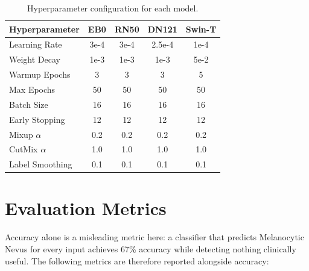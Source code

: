 \begin{table}[H]
\centering
\caption{Hyperparameter configuration for each model.}
\label{tab:hyperparams}
\begin{tabular}{lcccc}
\toprule
\textbf{Hyperparameter} & \textbf{EB0} & \textbf{RN50} & \textbf{DN121} & \textbf{Swin-T} \\
\midrule
Learning Rate        & 3e-4  & 3e-4  & 2.5e-4 & 1e-4 \\
Weight Decay         & 1e-3  & 1e-3  & 1e-3   & 5e-2 \\
Warmup Epochs        & 3     & 3     & 3      & 5 \\
Max Epochs           & 50    & 50    & 50     & 50 \\
Batch Size           & 16    & 16    & 16     & 16 \\
Early Stopping       & 12    & 12    & 12     & 12 \\
Mixup $\alpha$       & 0.2   & 0.2   & 0.2    & 0.2 \\
CutMix $\alpha$      & 1.0   & 1.0   & 1.0    & 1.0 \\
Label Smoothing      & 0.1   & 0.1   & 0.1    & 0.1 \\
\bottomrule
\end{tabular}
\end{table}

\section{Evaluation Metrics}

Accuracy alone is a misleading metric here: a classifier that predicts Melanocytic Nevus for every input achieves 67\% accuracy while detecting nothing clinically useful. The following metrics are therefore reported alongside accuracy:

